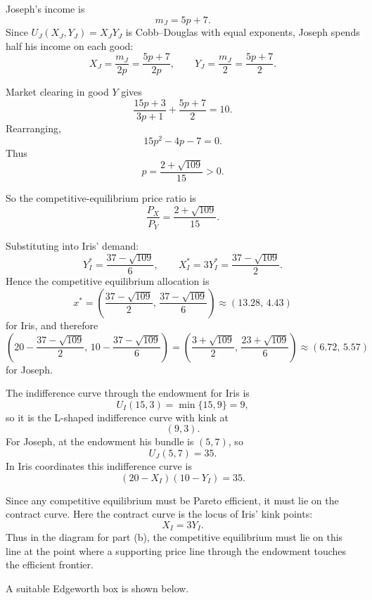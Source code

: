 \documentclass[12pt]{article}
\begin{document}
\begin{enumerate}[label=(\alph*)]
    Joseph's income is
    \[
    m_J=5p+7.
    \]
    Since \(U_J(X_J,Y_J)=X_JY_J\) is Cobb--Douglas with equal exponents, Joseph spends half his income on each good:
    \[
    X_J=\frac{m_J}{2p}=\frac{5p+7}{2p},
    \qquad
    Y_J=\frac{m_J}{2}=\frac{5p+7}{2}.
    \]

    Market clearing in good \(Y\) gives
    \[
    \frac{15p+3}{3p+1}+\frac{5p+7}{2}=10.
    \]
    Rearranging,
    \[
    15p^2-4p-7=0.
    \]
    Thus
    \[
    p=\frac{2+\sqrt{109}}{15}>0.
    \]

    So the competitive-equilibrium price ratio is
    \[
    \frac{P_X}{P_Y}=\frac{2+\sqrt{109}}{15}.
    \]

    Substituting into Iris' demand:
    \[
    Y_I^*=\frac{37-\sqrt{109}}{6},
    \qquad
    X_I^*=3Y_I^*=\frac{37-\sqrt{109}}{2}.
    \]
    Hence the competitive equilibrium allocation is
    \[
    x^*=\left(\frac{37-\sqrt{109}}{2},\,\frac{37-\sqrt{109}}{6}\right)
    \approx (13.28,\,4.43)
    \]
    for Iris, and therefore
    \[
    \left(20-\frac{37-\sqrt{109}}{2},\,10-\frac{37-\sqrt{109}}{6}\right)
    =
    \left(\frac{3+\sqrt{109}}{2},\,\frac{23+\sqrt{109}}{6}\right)
    \approx (6.72,\,5.57)
    \]
    for Joseph.

    The indifference curve through the endowment for Iris is
    \[
    U_I(15,3)=\min\{15,9\}=9,
    \]
    so it is the L-shaped indifference curve with kink at
    \[
    (9,3).
    \]
    For Joseph, at the endowment his bundle is \((5,7)\), so
    \[
    U_J(5,7)=35.
    \]
    In Iris coordinates this indifference curve is
    \[
    (20-X_I)(10-Y_I)=35.
    \]

    Since any competitive equilibrium must be Pareto efficient, it must lie on the contract curve. Here the contract curve is the locus of Iris' kink points:
    \[
    X_I=3Y_I.
    \]
    Thus in the diagram for part (b), the competitive equilibrium must lie on this line at the point where a supporting price line through the endowment touches the efficient frontier.

    A suitable Edgeworth box is shown below.

    \begin{center}
\end{center}
\end{enumerate}
\end{document}
